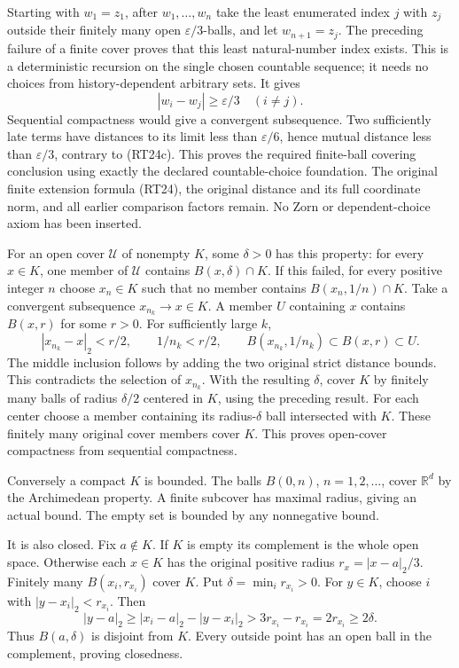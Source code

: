 \documentclass[
  11pt,
]{article}
\begin{document}
Starting with \(w_1=z_1\), after \(w_1,\ldots,w_n\) take the least
enumerated index \(j\) with \(z_j\) outside their finitely many open
\(\varepsilon/3\)-balls, and let \(w_{n+1}=z_j\). The preceding failure
of a finite cover proves that this least natural-number index exists.
This is a deterministic recursion on the single chosen countable
sequence; it needs no choices from history-dependent arbitrary sets. It
gives \[
 |w_i-w_j|\geq\varepsilon/3\quad(i\ne j).
 \tag{RT24c}
\] Sequential compactness would give a convergent subsequence. Two
sufficiently late terms have distances to its limit less than
\(\varepsilon/6\), hence mutual distance less than \(\varepsilon/3\),
contrary to (RT24c). This proves the required finite-ball covering
conclusion using exactly the declared countable-choice foundation. The
original finite extension formula (RT24), the original distance and its
full coordinate norm, and all earlier comparison factors remain. No Zorn
or dependent-choice axiom has been inserted.

For an open cover \(\mathcal U\) of nonempty \(K\), some \(\delta>0\)
has this property: for every \(x\in K\), one member of \(\mathcal U\)
contains \(B(x,\delta)\cap K\). If this failed, for every positive
integer \(n\) choose \(x_n\in K\) such that no member contains
\(B(x_n,1/n)\cap K\). Take a convergent subsequence
\(x_{n_k}\to x\in K\). A member \(U\) containing \(x\) contains
\(B(x,r)\) for some \(r>0\). For sufficiently large \(k\), \[
|x_{n_k}-x|_2<r/2,\qquad 1/n_k<r/2,\qquad
B(x_{n_k},1/n_k)\subset B(x,r)\subset U.
\tag{RT25}
\] The middle inclusion follows by adding the two original strict
distance bounds. This contradicts the selection of \(x_{n_k}\). With the
resulting \(\delta\), cover \(K\) by finitely many balls of radius
\(\delta/2\) centered in \(K\), using the preceding result. For each
center choose a member containing its radius-\(\delta\) ball intersected
with \(K\). These finitely many original cover members cover \(K\). This
proves open-cover compactness from sequential compactness.

Conversely a compact \(K\) is bounded. The balls \(B(0,n)\),
\(n=1,2,\ldots\), cover \(\mathbb R^d\) by the Archimedean property. A
finite subcover has maximal radius, giving an actual bound. The empty
set is bounded by any nonnegative bound.

It is also closed. Fix \(a\notin K\). If \(K\) is empty its complement
is the whole open space. Otherwise each \(x\in K\) has the original
positive radius \(r_x=|x-a|_2/3\). Finitely many \(B(x_i,r_{x_i})\)
cover \(K\). Put \(\delta=\min_i r_{x_i}>0\). For \(y\in K\), choose
\(i\) with \(|y-x_i|_2<r_{x_i}\). Then \[
|y-a|_2\ge |x_i-a|_2-|y-x_i|_2
>3r_{x_i}-r_{x_i}=2r_{x_i}\ge2\delta.
\tag{RT26}
\] Thus \(B(a,\delta)\) is disjoint from \(K\). Every outside point has
an open ball in the complement, proving closedness.
\end{document}
